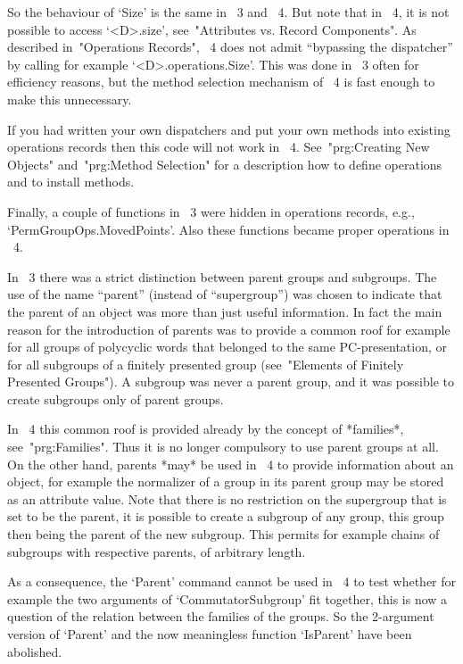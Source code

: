 So the behaviour of `Size' is the same in {\GAP}~3 and {\GAP}~4.
But note that in {\GAP}~4, it is not possible to access `<D>.size',
see~"Attributes vs. Record Components".
As described in~"Operations Records", {\GAP}~4 does not admit ``bypassing
the dispatcher'' by calling for example `<D>.operations.Size'.
This was done in {\GAP}~3 often for efficiency reasons,
but the method selection mechanism of {\GAP}~4 is fast enough to make
this unnecessary.

If you had written your own dispatchers and put your own methods into
existing operations records then this code will not work in {\GAP}~4.
See~"prg:Creating New Objects" and~"prg:Method Selection"
for a description how to define operations and to install methods.

Finally, a couple of functions in {\GAP}~3 were hidden in
operations records, e.g., `PermGroupOps.MovedPoints'.
Also these functions became proper operations in {\GAP}~4.



In {\GAP}~3 there was a strict distinction between parent groups and
subgroups.
The use of the name ``parent'' (instead of ``supergroup'')
was chosen to indicate that the parent of an object was more than just
useful information.
In fact the main reason for the introduction of parents was to provide
a common roof for example for all groups of polycyclic words that
belonged to the same PC-presentation, or for all subgroups of a finitely
presented group (see~"Elements of Finitely Presented Groups").
A subgroup was never a parent group, and it was possible to create
subgroups only of parent groups.

In {\GAP}~4 this common roof is provided already by the concept of
*families*, see~"prg:Families".
Thus it is no longer compulsory to use parent groups at all.
On the other hand, parents *may* be used in {\GAP}~4 to provide
information about an object, for example the normalizer of a group in its
parent group may be stored as an attribute value.
Note that there is no restriction on the supergroup that is set to be
the parent,
it is possible to create a subgroup of
any group, this group then being the parent of the new subgroup.
This permits for example chains of subgroups with respective parents,
of arbitrary length.

As a consequence, the `Parent' command cannot be used in {\GAP}~4
to test whether for example the two arguments of `CommutatorSubgroup'
fit together, this is now a question of the relation between the families
of the groups.
So the 2-argument version of `Parent' and the now meaningless function
`IsParent' have been abolished.


